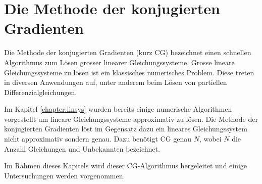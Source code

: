 %
%
%
\chapter{Die Methode der konjugierten Gradienten\label{chapter:cg}}
\begin{refsection}

Die Methode der konjugierten Gradienten (kurz CG) bezeichnet einen schnellen Algorithmus zum Lösen grosser linearer Gleichungssysteme.
Grosse lineare Gleichungssysteme zu lösen ist ein klassisches numerisches Problem.
Diese treten in diversen Anwendungen auf, unter anderem beim Lösen von partiellen Differenzialgleichungen.

Im Kapitel \ref{chapter:linsys} wurden bereits einige numerische Algorithmen vorgestellt um lineare Gleichungssysteme approximativ zu lösen.
Die Methode der konjugierten Gradienten löst im Gegensatz dazu ein lineares Gleichungssystem nicht approximativ sondern genau.
Dazu benötigt CG genau $N$, wobei $N$ die Anzahl Gleichungen und Unbekannten bezeichnet.

Im Rahmen dieses Kapitels wird dieser CG-Algorithmus hergeleitet und einige Untersuchungen werden vorgenommen.







\printbibliography[heading=subbibliography]
\end{refsection}
